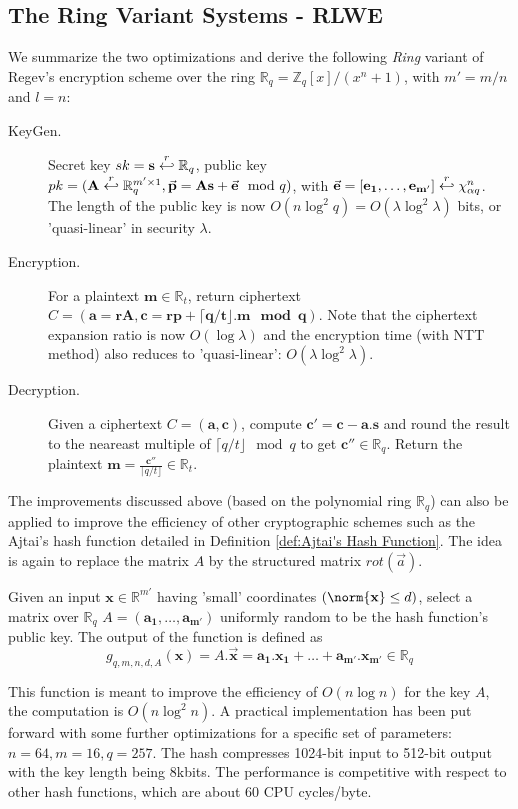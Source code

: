 \subsection{The Ring Variant Systems - RLWE}
\label{sec:RLWEPre}
We summarize the two optimizations and derive the following \emph{Ring} variant
of Regev's encryption scheme over the ring
$\mathbb{R}_q = \mathbb{Z}_q[x]/(x^n + 1)$, with $m' = m/n$ and $l = n$:
\begin{description}
\item[KeyGen.] Secret key $sk = \mathbf{s} \stackrel{r}{\hookleftarrow} \mathbb{R}_q$, public
  key
  $pk = (\mathbf{A} \stackrel{r}{\hookleftarrow} \mathbb{R}_q^{m' \times 1}, \vec{\mathbf{p}} =
  \mathbf{As} + \vec{\mathbf{e}} \mod q )$, with
  $\vec{\mathbf{e}} = [\mathbf{e_1, \dots, e_{m'}}] \stackrel{r}{\hookleftarrow} \chi_{\alpha
    q}^n$. The length of the public key is now
  $O(n \log^2 q) = O(\lambda \log^2 \lambda)$ bits, or 'quasi-linear' in
  security $\lambda$.
\item [Encryption.] For a plaintext $\mathbf{m} \in \mathbb{R}_t$, return
  ciphertext
  $C = (\mathbf{a = rA}, \mathbf{c = rp + \lceil q/t \rfloor. m \mod q })$. Note
  that the ciphertext expansion ratio is now $O(\log \lambda)$ and the
  encryption time (with NTT method) also reduces to 'quasi-linear':
  $O(\lambda \log^2 \lambda)$.
\item [Decryption.] Given a ciphertext $C = \mathbf{(a,c)}$, compute
  $\mathbf{c' = c - a.s}$ and round the result to the neareast multiple of
  $\lceil q/t \rfloor \mod q$ to get $\mathbf{c''} \in \mathbb{R}_q$. Return the
  plaintext
  $\mathbf{m} = \frac{\mathbf{c''}}{\lceil q/t \rfloor} \in \mathbb{R}_t$.
\end{description}
The improvements discussed above (based on the polynomial ring $\mathbb{R}_q$) can
also be applied to improve the efficiency of other cryptographic schemes such as
the Ajtai's hash function detailed in Definition \ref{def:Ajtai's Hash
  Function}. The idea is again to replace the matrix $A$ by the structured
matrix $rot(\vec{a})$.

\begin{definition}
   Given an input
  $\mathbf{x} \in \mathbb{R}^{m'}$ having 'small' coordinates
  $(\norm{\mathbf{x}} \leq d)$, select a matrix over $\mathbb{R}_q$
  $A=(\mathbf{a_1, \dots, a_{m'}})$ uniformly random to be the hash function's
  public key.  The output of the function is defined as
  \[
    g_{q,m,n,d,A}(\mathbf{x}) = A.\vec{\mathbf{x}} = \mathbf{a_1.x_1 + \dots +
      a_{m'}.x_{m'}} \in \mathbb{R}_q
  \]
  \label{def:AjtaiRing}
\end{definition}
This function is meant to improve the efficiency of $O(n\log n)$ for the key $A$,
the computation is $O(n\log^2 n)$. A practical implementation has been put forward
\cite{lyubashevsky2008swifft} with some further optimizations for a specific set
of parameters: $n = 64, m = 16, q = 257$. The hash compresses 1024-bit input to
512-bit output with the key length being 8kbits. The performance is competitive with respect to
other hash functions, which are about 60 CPU cycles/byte.

